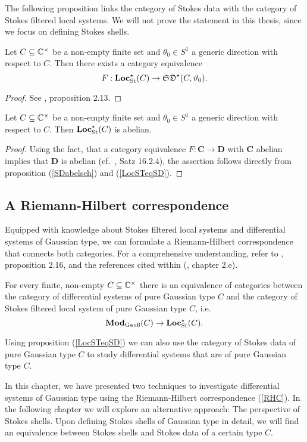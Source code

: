 
The following proposition links the category of Stokes data with the category of Stokes filtered local systems. We will not prove the statement in this thesis, since we focus on defining Stokes shells. 

\begin{prop}\label{LocSTeqSD}
    Let $C \subseteq \C^\times$ be a non-empty finite set and $\theta_0 \in S^1$ a generic direction with respect to $C$. Then there exists a category equivalence 
    \[ F: \Locpure(C) \to \SDpure(C,\theta_0).\]
\end{prop}

\begin{proof}
    See \cite{Sabbah_2016}, proposition 2.13.
\end{proof}

\begin{cor}
    Let $C \subseteq \C^\times$ be a non-empty finite set and $\theta_0 \in S^1$ a generic direction with respect to $C$. Then $\Locpure(C)$ is abelian.
\end{cor}
\begin{proof}
    Using the fact, that a category equivalence $F: \mathbf{C} \to \mathbf{D}$ with $\mathbf{C}$ abelian implies that $\mathbf{D}$ is abelian (cf.\ \cite{schubert_1970}, Satz 16.2.4), the assertion follows directly from proposition (\ref{SDabelsch}) and (\ref{LocSTeqSD}).
\end{proof}

\subsection{A Riemann-Hilbert correspondence}

Equipped with knowledge about Stokes filtered local systems and differential systems of Gaussian type, we can formulate a Riemann-Hilbert correspondence that connects both categories. For a comprehensive understanding, refer to \cite{Del}, \cite{Sabbah_2016} proposition 2.16, and the references cited within (\cite{Sabbah_2016}, chapter 2.e).

\begin{thm}\label{RHC}
   For every finite, non-empty $C \subseteq \C^\times$ there is an equivalence of categories between the category of differential systems of pure Gaussian type $C$ and the category of Stokes filtered local system of pure Gaussian type $C$, i.e.\
   \[
   \Mod(C) \to \Locpure(C).
   \]
\end{thm}

\begin{rem}
    Using proposition (\ref{LocSTeqSD}) we can also use the category of Stokes data of pure Gaussian type $C$ to study differential systems that are of pure Gaussian type $C$.
\end{rem}

In this chapter, we have presented two techniques to investigate differential systems of Gaussian type using the Riemann-Hilbert correspondence (\ref{RHC}). In the following chapter we will explore an alternative approach: The perspective of Stokes shells. Upon defining Stokes shells of Gaussian type in detail, we will find an equivalence between Stokes shells and Stokes data of a certain type $C$.
